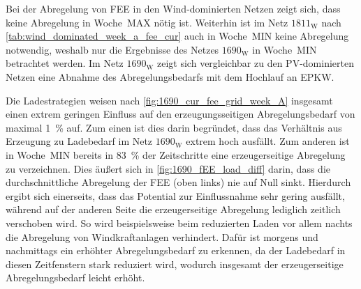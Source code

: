 Bei der Abregelung von \gls{FEE} in den Wind-dominierten Netzen zeigt sich, dass keine Abregelung in Woche~MAX nötig ist.
Weiterhin ist im Netz \(1811_{\text{W}}\) nach \autoref{tab:wind_dominated_week_a_fee_cur} auch in Woche~MIN keine Abregelung notwendig, weshalb nur die Ergebnisse des Netzes \(1690_{\text{W}}\) in Woche~MIN betrachtet werden.
Im Netz \(1690_{\text{W}}\) zeigt sich vergleichbar zu den \gls{PV}-dominierten Netzen eine Abnahme des Abregelungsbedarfs mit dem Hochlauf an \gls{EPKW}.



Die Ladestrategien weisen nach \autoref{fig:1690_cur_fee_grid_week_A} insgesamt einen extrem geringen Einfluss auf den erzeugungsseitigen Abregelungsbedarf von maximal \SI{1}{\percent} auf.
Zum einen ist dies darin begründet, dass das Verhältnis aus Erzeugung zu Ladebedarf im Netz \(1690_{\text{W}}\) extrem hoch ausfällt.
Zum anderen ist in Woche~MIN bereits in \SI{83}{\percent} der Zeitschritte eine erzeugerseitige Abregelung zu verzeichnen.
Dies äußert sich in \autoref{fig:1690_fEE_load_diff} darin, dass die durchschnittliche Abregelung der \gls{FEE} (oben links) nie auf Null sinkt.
Hierdurch ergibt sich einerseits, dass das Potential zur Einflussnahme sehr gering ausfällt, während auf der anderen Seite die erzeugerseitige Abregelung lediglich zeitlich verschoben wird.
So wird beispielsweise beim reduzierten Laden vor allem nachts die Abregelung von Windkraftanlagen verhindert.
Dafür ist morgens und nachmittags ein erhöhter Abregelungsbedarf zu erkennen, da der Ladebedarf in diesen Zeitfenstern stark reduziert wird, wodurch insgesamt der erzeugerseitige Abregelungsbedarf leicht erhöht.



